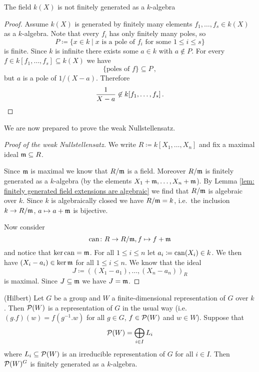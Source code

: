 \begin{rem}
  The field $k(X)$ is not finitely generated as a $k$-algebra
  \begin{proof}
    Assume $k(X)$ is generated by finitely many elements $f_1, \dotsc, f_s \in k(X)$ as a $k$-algebra. Note that every $f_i$ has only finitely many poles, so
    \[
      P \coloneqq \{x \in k \mid \text{$x$ is a pole of $f_i$ for some $1 \leq i \leq s$}\}
    \]
    is finite. Since $k$ is infinite there exists some $a \in k$ with $a \not\in P$. For every $f \in k[f_1, \dotsc, f_s] \subseteq k(X)$ we have
    \[
      \{\text{poles of $f$}\} \subseteq P \,,
    \]
      but $a$ is a pole of $1/(X-a)$. Therefore
    \[
      \frac{1}{X-a} \not\in k[f_1, \dotsc, f_s] \,.
      \qedhere
    \]
  \end{proof}
\end{rem}


We are now prepared to prove the weak Nullstellensatz.


\begin{proof}[Proof of the weak Nullstellensatz]
  We write $R \coloneqq k[X_1, \dotsc, X_n]$ and fix a maximal ideal $\mathfrak{m} \subseteq R$.
  
  Since $\mathfrak{m}$ is maximal we know that $R / \mathfrak{m}$ is a field.
  Moreover $R / \mathfrak{m}$ is finitely generated as a $k$-algebra (by the elements $X_1 + \mathfrak{m}, \dotsc, X_n + \mathfrak{m}$).
  By Lemma \ref{lem: finitely generated field extensions are algebraic} we find that $R/\mathfrak{m}$ is algebraic over $k$.
  Since $k$ is algebraically closed we have $R / \mathfrak{m} = k$, i.e.\ the inclusion $k \to R / \mathfrak{m}$, $a \mapsto a + \mathfrak{m}$ is bijective.
  
  Now consider
  \[
            \operatorname{can}
    \colon  R \to R / \mathfrak{m},
            f
    \mapsto f + \mathfrak{m}
  \]
  and notice that $\ker \operatorname{can} = \mathfrak{m}$.
  For all $1 \leq i \leq n$ let $a_i \coloneqq \operatorname{can}(X_i) \in k$.
  We then have $(X_i - a_i) \in \ker \mathfrak{m}$ for all $1 \leq i \leq n$.
  We know that the ideal
  \[
              J
    \coloneqq ( (X_1 - a_1), \dotsc, (X_n - a_n) )_R
  \]
  is maximal.
  Since $J \subseteq \mathfrak{m}$ we have $J = \mathfrak{m}$.
\end{proof}


\begin{thrm}(Hilbert)
  Let $G$ be a group and $W$ a finite-dimensional representation of $G$ over $k$.
  Then $\mathcal{P}(W)$ is a representation of $G$ in the usual way (i.e.\ $(g.f)(w) = f\left( g^{-1}.w \right)$ for all $g \in G$, $f \in \mathcal{P}(W)$ and $w \in W$).
  Suppose that
  \[
      \mathcal{P}(W)
    = \bigoplus_{i \in I} L_i
  \]
  where $L_i \subseteq \mathcal{P}(W)$ is an irreducible representation of $G$ for all $i \in I$.
  Then $\mathcal{P}(W)^G$ is finitely generated as a $k$-algebra.
\end{thrm}


